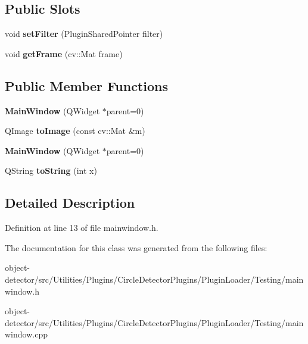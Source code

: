 \subsection*{Public Slots}
\begin{DoxyCompactItemize}
\item 
\mbox{\label{class_main_window_a1cf303b30189f7c13c1424e083fc74bb}} 
void {\bfseries set\+Filter} (Plugin\+Shared\+Pointer filter)
\item 
\mbox{\label{class_main_window_ac31c3aecb10653808fd156b53add4acc}} 
void {\bfseries get\+Frame} (cv\+::\+Mat frame)
\end{DoxyCompactItemize}
\subsection*{Public Member Functions}
\begin{DoxyCompactItemize}
\item 
\mbox{\label{class_main_window_a8b244be8b7b7db1b08de2a2acb9409db}} 
{\bfseries Main\+Window} (Q\+Widget $\ast$parent=0)
\item 
\mbox{\label{class_main_window_ae02ddfba3265ace1ae67032f4a4c91f4}} 
Q\+Image {\bfseries to\+Image} (const cv\+::\+Mat \&m)
\item 
\mbox{\label{class_main_window_a8b244be8b7b7db1b08de2a2acb9409db}} 
{\bfseries Main\+Window} (Q\+Widget $\ast$parent=0)
\item 
\mbox{\label{class_main_window_a2b4d41b838e4fb53f4fdf4951cc69db4}} 
Q\+String {\bfseries to\+String} (int x)
\end{DoxyCompactItemize}


\subsection{Detailed Description}


Definition at line 13 of file mainwindow.\+h.



The documentation for this class was generated from the following files\+:\begin{DoxyCompactItemize}
\item 
object-\/detector/src/\+Utilities/\+Plugins/\+Circle\+Detector\+Plugins/\+Plugin\+Loader/\+Testing/mainwindow.\+h\item 
object-\/detector/src/\+Utilities/\+Plugins/\+Circle\+Detector\+Plugins/\+Plugin\+Loader/\+Testing/mainwindow.\+cpp\end{DoxyCompactItemize}
